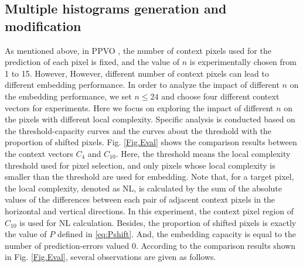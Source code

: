 \documentclass[review,3p,10pt,sort&compress]{elsarticle}
\begin{document}
\subsection{Multiple histograms generation and modification}\label{sec:3.2}
As mentioned above, in PPVO \cite{Qu2015PPVO}, the number of context pixels used for the prediction of each pixel is fixed, and the value of $n$ is experimentally chosen from 1 to 15. However, However, different number of context pixels can lead to different embedding performance. In order to analyze the impact of different $n$ on the embedding performance,
we set $n\leq 24$ and choose four different context vectors for experiments. 
\textcolor[rgb]{1.00,0.00,0.00}{Here we focus on exploring the impact of different $n$ on the pixels with different local complexity.}
Specific analysis is conducted based on the threshold-capacity curves and the curves about the threshold with the proportion of shifted pixels. Fig. \ref{Fig.Eval} shows the comparison results between the context vectors $C_4$ and $C_{10}$. Here, the threshold means the local complexity threshold used for pixel selection, and only pixels whose local complexity is smaller than the threshold are used for embedding. Note that, for a target pixel, the local complexity, denoted as NL, is calculated by the sum of the absolute values of the differences between each pair of adjacent context pixels in the horizontal and vertical directions. In this experiment, 
\textcolor[rgb]{1.00,0.00,0.00}{the context pixel region of $C_{10}$ is used for NL calculation.}
Besides, the proportion of shifted pixels is exactly the value of $P$ defined in \eqref{eq:Pshift}. And, the embedding capacity is equal to the number of prediction-errors valued 0. According to the comparison results shown in Fig. \ref{Fig.Eval}, several observations are given as follows.
\end{document}
